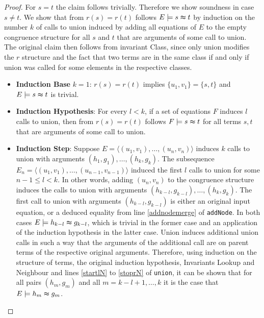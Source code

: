 \begin{proof}
For $s = t$ the claim follows trivially.
Therefore we show soundness in case $s \neq t$.
We show that from $r(s) = r(t)$ follows $E \models s \thickapprox t$ by induction on the number $k$ of calls to union induced by adding all equations of $E$ to the empty congruence structure for all $s$ and $t$ that are arguments of some call to union.
The original claim then follows from invariant Class, since only union modifies the $r$ structure and the fact that two terms are in the same class if and only if union was called for some elements in the respective classes.
\begin{itemize}
\item \textbf{Induction Base} $k = 1$: $r(s) = r(t)$ implies $\{u_1,v_1\} = \{s,t\}$ and $E \models s \thickapprox t$ is trivial.


\item \textbf{Induction Hypothesis}: For every $l < k$, if a set of equations $F$ induces $l$ calls to union, then from $r(s) = r(t)$ follows $F \models s \thickapprox t$ for all terms $s,t$ that are arguments of some call to union.

\item \textbf{Induction Step}: Suppose $E = \langle (u_1,v_1), \ldots, (u_n,v_n) \rangle$ induces $k$ calls to union with arguments $(h_1,g_1),\ldots,(h_k,g_k)$.
The subsequence $E_n = \langle (u_1,v_1), \ldots, (u_{n-1},v_{n-1}) \rangle$ induced the first $l$ calls to union for some $n-1 \leq l < k$.
In other words, adding $(u_n,v_n)$ to the congruence structure induces the calls to union with arguments $(h_{k-l},g_{k-l}),\ldots,(h_k,g_k)$.
The first call to union with arguments $(h_{k-l},g_{k-l})$ is either an original input equation, or a deduced equality from line \ref{addnodemerge} of \texttt{addNode}.
In both cases $E \models h_{k-l} \thickapprox g_{k-l}$, which is trivial in the former case and an application of the induction hypothesis in the latter case.
Union induces additional union calls in such a way that the arguments of the additional call are on parent terms of the respective original arguments.
Therefore, using induction on the structure of terms, the original induction hypothesis, Invariants Lookup and Neighbour and lines \ref{startlN} to \ref{stoprN} of \texttt{union}, it can be shown that for all pairs $(h_m,g_m)$ and all $m = k-l+1,\ldots,k$ it is the case that $E \models h_m \thickapprox g_m$.


\end{itemize}
\end{proof}
